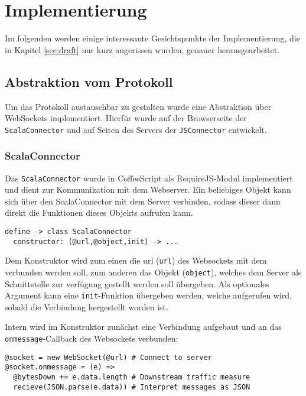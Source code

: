 \chapter{Implementierung}
\label{sec:imp}

Im folgenden werden einige interessante Gesichtspunkte der Implementierung, die in Kapitel
\ref{sec:draft} nur kurz angerissen wurden, genauer herausgearbeitet.

\section{Abstraktion vom Protokoll}
\label{sec:jsc}

Um das Protokoll austauschbar zu gestalten wurde eine Abstraktion über WebSockets implementiert.
Hierfür wurde auf der Browserseite der \texttt{ScalaConnector} und auf Seiten des Servers der
\texttt{JSConnector} entwickelt.

\subsection{ScalaConnector}

Das \texttt{ScalaConnector} wurde in CoffeeScript als RequireJS-Modul implementiert und dient zur
Kommunikation mit dem Webserver. Ein beliebiges Objekt kann sich über den ScalaConnector mit dem
Server verbinden, sodass dieser dann direkt die Funktionen dieses Objekts aufrufen kann.

\begin{lstlisting}
define -> class ScalaConnector
  constructor: (@url,@object,init) -> ...
\end{lstlisting}

Dem Konstruktor wird zum einen die url (\texttt{url}) des Websockets mit dem verbunden werden soll,
zum anderen das Objekt (\texttt{object}), welches dem Server als Schnittstelle zur verfügung
gestellt werden soll übergeben. Als optionales Argument kann eine \texttt{init}-Funktion übergeben
werden, welche aufgerufen wird, sobald die Verbindung hergestellt worden ist.

Intern wird im Konstruktor zunächst eine Verbindung aufgebaut und an das
\texttt{onmessage}-Callback des Websockets verbunden:

\begin{lstlisting}
@socket = new WebSocket(@url) # Connect to server
@socket.onmessage = (e) =>    
  @bytesDown += e.data.length # Downstream traffic measure
  recieve(JSON.parse(e.data)) # Interpret messages as JSON
\end{lstlisting}

